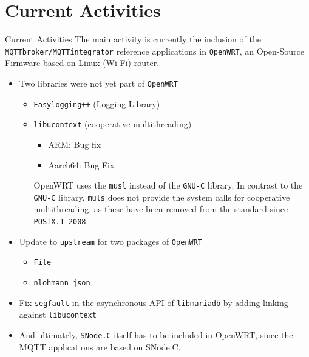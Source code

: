 ﻿\part{Current Activities}

\begin{frame}{Current Activities}
   The main activity is currently the \alert{inclusion} of the \alert{\texttt{MQTTbroker/MQTTintegrator}} reference applications in \alert{\texttt{OpenWRT}}, an \alert{Open-Source Firmware} based on \alert{Linux} (Wi-Fi) router.

   \begin{itemize}
     \item Two libraries were not yet part of \texttt{OpenWRT}
     \begin{itemize}
       \item \alert{\texttt{Easylogging++}} (Logging Library)
       \item \alert{\texttt{libucontext}} (cooperative multithreading)
       \begin{itemize}
         \item ARM: Bug fix
         \item Aarch64: Bug Fix
       \end{itemize}
       OpenWRT uses the \alert{\texttt{musl}} instead of the \alert{\texttt{GNU-C}} library. In contrast to the \texttt{GNU-C} library, \texttt{muls} does not provide the system calls for cooperative multithreading, as these have been removed from the standard since \texttt{POSIX.1-2008}.
     \end{itemize}
     \item Update to \alert{\texttt{upstream}} for two packages of \texttt{OpenWRT}
     \begin{itemize}
       \item \alert{\texttt{File}}
       \item \alert{\texttt{nlohmann\_json}}
     \end{itemize}
     \item Fix \alert{\texttt{segfault}} in the \alert{asynchronous API} of \alert{\texttt{libmariadb}} by adding linking against \alert{\texttt{libucontext}}
     \item And ultimately, \alert{\texttt{SNode.C}} itself has to be included in OpenWRT, since the MQTT applications are based on SNode.C.
   \end{itemize}
\end{frame}